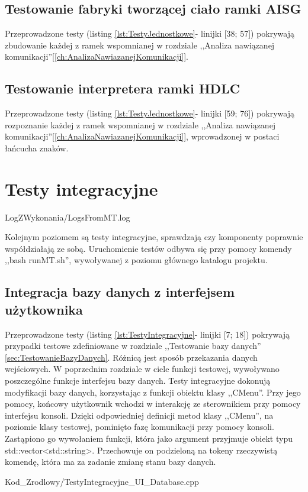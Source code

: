     \subsection{Testowanie fabryki tworzącej ciało ramki AISG}
        Przeprowadzone testy (listing \ref{lst:TestyJednostkowe}- linijki [38; 57]) pokrywają zbudowanie każdej z ramek
        wspomnianej w rozdziale ,,Analiza nawiązanej komunikacji''[\ref{ch:AnalizaNawiazanejKomunikacji}].
    \subsection{Testowanie interpretera ramki HDLC}
        Przeprowadzone testy (listing \ref{lst:TestyJednostkowe}- linijki [59; 76]) pokrywają rozpoznanie każdej z ramek 
        wspomnianej w rozdziale ,,Analiza nawiązanej komunikacji''[\ref{ch:AnalizaNawiazanejKomunikacji}], wprowadzonej w postaci łańcucha znaków.


\section{Testy integracyjne}
    
    {LogZWykonania/LogsFromMT.log}
    
    Kolejnym poziomem są testy integracyjne, sprawdzają czy komponenty poprawnie współdziałają ze sobą\cite{Testowanie}. 
    Uruchomienie testów odbywa się przy pomocy komendy ,,bash runMT.sh'', wywoływanej z poziomu głównego katalogu projektu.
    
    \subsection{Integracja bazy danych z interfejsem użytkownika}
    Przeprowadzone testy (listing \ref{lst:TestyIntegracyjne}- linijki [7; 18]) pokrywają przypadki testowe zdefiniowane w rozdziale ,,Testowanie bazy danych''
    \ref{sec:TestowanieBazyDanych}.
    Różnicą jest sposób przekazania danych wejściowych. W poprzednim rozdziale w ciele funkcji testowej, wywoływano poszczególne funkcje interfejsu bazy danych.
    Testy integracyjne dokonują modyfikacji bazy danych, korzystając z funkcji obiektu klasy ,,CMenu''. Przy jego pomocy, końcowy użytkownik wchodzi w interakcję ze sterownikiem  
    przy pomocy interfejsu konsoli. Dzięki odpowiedniej definicji metod klasy ,,CMenu'', na poziomie klasy testowej, pominięto fazę komunikacji przy pomocy konsoli.
    Zastąpiono go wywołaniem funkcji, która jako argument przyjmuje obiekt typu std::vector<std::string>. Przechowuje on podzieloną na tokeny rzeczywistą komendę,
    która ma za zadanie zmianę stanu bazy danych.
    
        {Kod_Zrodlowy/TestyIntegracyjne_UI_Database.cpp}

